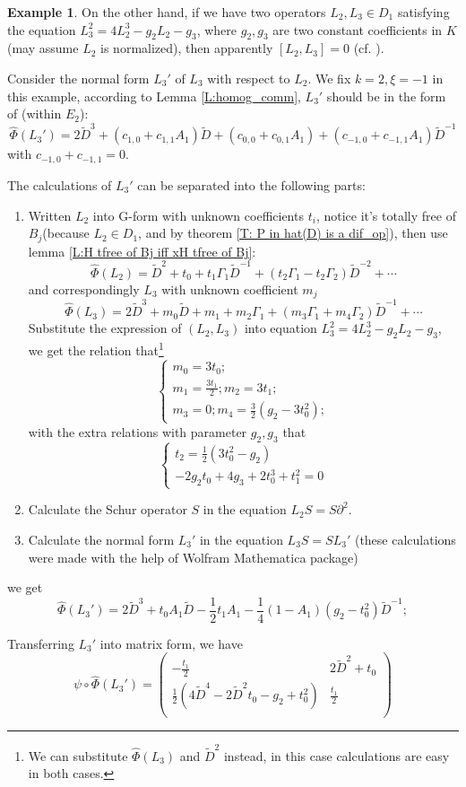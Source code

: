 \documentclass[11pt]{article}
\theoremstyle{definition}
\newtheorem{ex}{Example}[section]
\theoremstyle{plain}
\numberwithin{equation}{section}
\begin{document}
\begin{ex}
	\label{Ex: Rank 1 normal form}
	On the other hand, if we have two operators $L_2,L_3\in D_1$ satisfying the equation $L_3^2=4L_2^3-g_2L_2-g_3$, where $g_2,g_3$ are two constant coefficients in $K$ (may assume $L_2$ is normalized), then apparently $[L_2,L_3]=0$ (cf. \cite{BC1}). 
	
	Consider the normal form $L_3'$ of $L_3$ with respect to $L_2$. We fix $k=2,\xi=-1$ in this example, according to Lemma \ref{L:homog_comm}, $L_3'$ should be in the form of (within $E_2$):
	$$
	\hat{\Phi}(L_3')=2\tilde{D}^3+(c_{1,0}+c_{1,1}A_1)\tilde{D}+(c_{0,0}+c_{0,1}A_1)+(c_{-1,0}+c_{-1,1}A_1)\tilde{D}^{-1}
	$$
	with $c_{-1,0}+c_{-1,1}=0$.
	
	The calculations of $L_3'$ can be  separated into the following parts:
	\begin{enumerate}
		\item Written $L_2$ into G-form with unknown coefficients $t_i$, notice it's totally free of $B_j$(because $L_2\in D_1$, and by theorem \ref{T: P in hat(D) is a dif_op}), then use lemma \ref{L:H tfree of Bj iff xH tfree of Bj}:
		$$
		\hat{\Phi}(L_2)=\tilde{D}^2+t_0+t_1\Gamma_1\tilde{D}^{-1} +(t_2\Gamma_1-t_2\Gamma_2)\tilde{D}^{-2}+\cdots
		$$
		and correspondingly $L_3$ with unknown coefficient $m_j$
		$$
		\hat{\Phi}(L_3)=2\tilde{D}^3+m_0\tilde{D}+m_1+m_2\Gamma_1+(m_3\Gamma_1+m_4\Gamma_2)\tilde{D}^{-1}+\cdots
		$$
		Substitute the expression of $(L_2,L_3)$ into equation $L_3^2=4L_2^3-g_2L_2-g_3$, we get the relation that\footnote{We can substitute $\hat{\Phi}(L_3)$ and $\tilde{D}^2$ instead, in  this case calculations are easy in both cases.} 
		$$
		\begin{cases}
			m_0=3 t_0;
			\\m_1=\frac{3 t_1}{2};m_2=3 t_1;
			\\m_3=0;m_4=\frac{3}{2} (g_2-3 t_0^2);
		\end{cases}
		$$
		with the extra relations with parameter $g_2,g_3$ that 
		$$
		\begin{cases}
			t_2=\frac{1}{2} (3 t_0^2-g_2)
			\\-2 g_2 t_0+4 g_3+2 t_0^3+t_1^2=0
		\end{cases}
		$$
		\item Calculate the Schur operator $S$ in the equation $L_2S=S\partial^2$.
		\item Calculate the normal form $L_3'$ in the equation $L_3S=SL_3'$ (these calculations were made with the help of Wolfram Mathematica package)
	\end{enumerate}
	we get 
	$$
	\hat{\Phi}(L_3')=2 \tilde{D}^3+ t_0 A_1\tilde{D} -\frac{1}{2} t_1 A_1-\frac{1}{4}(1-A_1) \left(g_2-t_0^2\right)\tilde{D}^{-1};
	$$
	
	Transferring $L_3'$ into matrix form, we have 
	$$
	\psi\circ \hat{\Phi}(L_3')=\left(
	\begin{array}{cc}
		-\frac{t_1}{2} & 2 \tilde{D}^2+t_0 \\
		\frac{1}{2} \left(4 \tilde{D}^4-2 \tilde{D}^2 t_0-g_2+t_0^2\right) & \frac{t_1}{2} \\
	\end{array}
	\right)
	$$
\end{ex}
\end{document}
